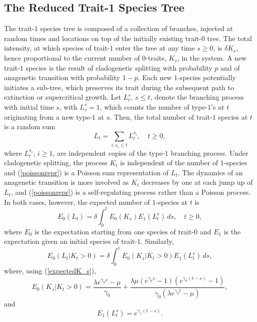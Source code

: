 \documentclass[a4paper,11pt]{article}
\theoremstyle{plain}
\theoremstyle{definition}
\numberwithin{equation}{section}
\begin{document}
\subsection*{The Reduced Trait-1 Species Tree}

The trait-$1$ species tree is composed of a collection of branches,
injected at random times and locations on top of the initially
existing trait-$0$ tree. The total intensity, at which species of trait-$1$ 
enter the tree at any time $s\ge 0$, is $\delta K_s$, hence
proportional to the current number of $0$-traits, $K_s$, in the system.
A new trait-$1$ species is the result of cladogenetic
splitting with probability $p$ and of anagenetic transition with
probability $1-p$. Each new $1$-species potentially initiates a sub-tree,
which preserves its trait during the subsequent path to extinction or
supercritical growth. Let $L_t^s$, $s\le t$, denote the branching
process with initial time $s$,  with $L_s^s=1$, which counts the number of
type-$1$'s at $t$ originating from a new type-$1$ at $s$. Then, the
total number of trait-$1$ species at $t$ is a random sum
\begin{equation}\label{poissonrepr}
L_t=\sum_{i: s_i\le t} L_t^{s_i},\quad t\ge 0,
\end{equation}
where $L_t^{s_i}$, $i\ge 1$, are independent copies of the type-$1$
branching process. Under cladogenetic splitting, the process $K_t$ is
independent of the number of $1$-species and (\ref{poissonrepr}) is a
Poisson sum representation of $L_t$.  The dynamics of an anagenetic
transition is more involved as $K_t$ decreases by one at each jump up
of $L_t$, and (\ref{poissonrepr}) is a self-regulating 
process rather than a Poisson process.  In both cases, however, the
expected number of $1$-species at $t$ is
\[
E_0(L_t)
=\delta\int_0^t E_0(K_s)E_1(L_t^s)\,ds ,\quad t\ge 0,
\]
where $E_0$ is the expectation starting from one species of trait-$0$
and $E_1$ is the expectation given an initial species of trait-$1$.
Similarly, 
\begin{equation} 
E_0(L_t|K_t>0) =\delta\int_0^t E_0(K_s|K_t>0)E_1(L_t^s)\,ds,
\label{expectedL}
\end{equation}
where, using (\ref{expectedK_s}),
\begin{equation}
E_0(K_s|K_t>0)= \frac{\lambda e^{\gamma_0 s}-\mu}{\gamma_0}
    + \frac{\lambda\mu(e^{\gamma_0 s}-1)(e^{\gamma_0(t-s)}-1)}
             {\gamma_0(\lambda e^{\gamma_0 t}-\mu)},
     \label{K_s}
\end{equation}
and
\begin{equation} 
E_1(L_t^s)=e^{\gamma_1(t-s)}.
\label{L_ts}
\end{equation}
\end{document}
